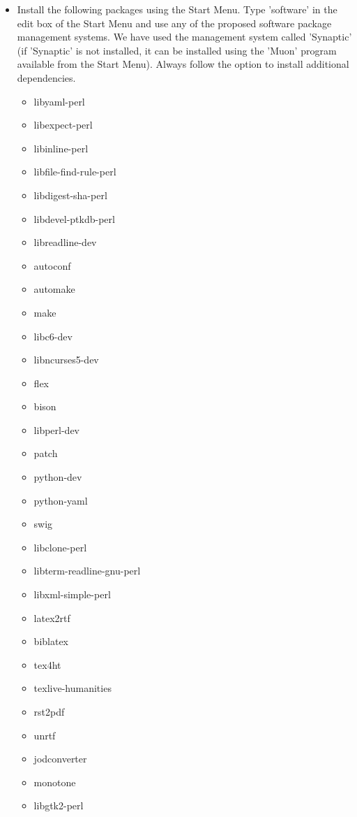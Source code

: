 \documentclass[12pt]{article}
\begin{document}
\begin{itemize}
\item[] Install the following packages using the Start Menu.  Type
  'software' in the edit box of the Start Menu and use any of the
  proposed software package management systems.  We have used the
  management system called 'Synaptic' (if 'Synaptic' is not installed,
  it can be installed using the 'Muon' program available from the
  Start Menu).  Always follow the option to install additional
  dependencies.
      \begin{itemize}
         \item libyaml-perl
         \item libexpect-perl
         \item libinline-perl
         \item libfile-find-rule-perl
         \item libdigest-sha-perl
         \item libdevel-ptkdb-perl
         \item libreadline-dev
         \item autoconf
         \item automake
         \item make
         \item libc6-dev
         \item libncurses5-dev
         \item flex
         \item bison
         \item libperl-dev
         \item patch
         \item python-dev
         \item python-yaml
         \item swig
         \item libclone-perl
         \item libterm-readline-gnu-perl
         \item libxml-simple-perl
         \item latex2rtf
         \item biblatex
         \item tex4ht
         \item texlive-humanities
         \item rst2pdf
         \item unrtf
         \item jodconverter
         \item monotone
         \item libgtk2-perl

\end{itemize}
\end{itemize}
\end{document}
